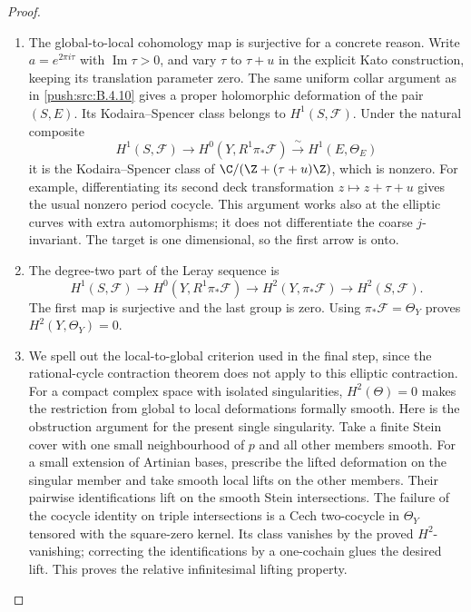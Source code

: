 \begin{proof}
\begin{enumerate}[label=\arabic*.,leftmargin=*]
\item The global-to-local cohomology map is surjective for a concrete
reason.  Write $a=e^{2\pi i\tau}$ with $\operatorname{Im}\tau>0$,
and vary $\tau$ to $\tau+u$ in the explicit Kato construction,
keeping its translation parameter zero.
The same uniform collar argument as in \ref{push:src:B.4.10} gives a proper
holomorphic deformation of the pair $(S,E)$.
Its Kodaira--Spencer class belongs to $H^1(S,\mathcal F)$.
Under the natural composite
\[
 H^1(S,\mathcal F)\longrightarrow
 H^0(Y,R^1\pi_*\mathcal F)
 \xrightarrow{\ \sim\ }H^1(E,\Theta_E)
\]
it is the Kodaira--Spencer class of
$\C/(\Z+(\tau+u)\Z)$, which is nonzero.
For example, differentiating its second deck transformation
$z\mapsto z+\tau+u$ gives the usual nonzero period cocycle.
This argument works also at the elliptic curves with extra
automorphisms; it does not differentiate the coarse $j$-invariant.
The target is one dimensional, so the first arrow is onto.

\item The degree-two part of the Leray sequence is
\[
 H^1(S,\mathcal F)\longrightarrow
 H^0(Y,R^1\pi_*\mathcal F)\longrightarrow
 H^2(Y,\pi_*\mathcal F)\longrightarrow H^2(S,\mathcal F).
\]
The first map is surjective and the last group is zero.
Using $\pi_*\mathcal F=\Theta_Y$ proves
$H^2(Y,\Theta_Y)=0$.

\item We spell out the local-to-global criterion used in the final
step, since the rational-cycle contraction theorem does not
apply to this elliptic contraction.
For a compact complex space with isolated singularities,
$H^2(\Theta)=0$ makes the restriction from global to local
deformations formally smooth.
Here is the obstruction argument for the present single
singularity.  Take a finite Stein cover with one small
neighbourhood of $p$ and all other members smooth.
For a small extension of Artinian bases, prescribe the lifted
deformation on the singular member and take smooth local
lifts on the other members.  Their pairwise identifications
lift on the smooth Stein intersections.  The failure of the
cocycle identity on triple intersections is a Cech two-cocycle
in $\Theta_Y$ tensored with the square-zero kernel.
Its class vanishes by the proved $H^2$-vanishing; correcting
the identifications by a one-cochain glues the desired lift.
This proves the relative infinitesimal lifting property.


\end{enumerate}
\end{proof}
